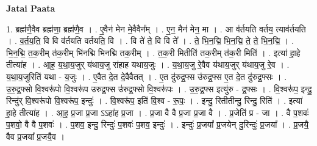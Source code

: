 \documentclass[17pt]{extarticle}
\begin{document}
\textbf{Jatai Paata} \newline

1. ब्रह्म॑णै॒वैव ब्रह्म॑णा॒ ब्रह्म॑णै॒व । . ए॒वैन॑ मेन मे॒वैवैन᳚म् । . ए॒न॒ मैन॑ मेन॒ मा । . आ व॑र्तयति वर्तय॒ त्याव॑र्तयति । . व॒र्त॒य॒ति॒ वि वि व॑र्तयति वर्तयति॒ वि । . वि ते॑ ते॒ वि वि ते᳚ । . ते॒ भि॒न॒द्मि॒ भि॒न॒द्मि॒ ते॒ ते॒ भि॒न॒द्मि॒ । . भि॒न॒द्मि॒ त॒क॒रीम् त॑क॒रीम् भि॑नद्मि भिनद्मि तक॒रीम् । . त॒क॒री मितीति॑ तक॒रीम् त॑क॒री मिति॑ । . इत्या॑ हा॒हे तीत्या॑ह । . आ॒ह॒ य॒था॒य॒जुर् य॑थाय॒जु रा॑हाह यथाय॒जुः । . य॒था॒य॒जु रे॒वैव य॑थाय॒जुर् य॑थाय॒जु रे॒व । . य॒था॒य॒जुरिति॑ यथा - य॒जुः । . ए॒वैत दे॒त दे॒वैवैतत् । . ए॒त दु॑रुद्र॒फ्स उ॑रुद्र॒फ्स ए॒त दे॒त दु॑रुद्र॒फ्सः । . उ॒रु॒द्र॒फ्सो वि॒श्वरू॑पो वि॒श्वरू॑प उरुद्र॒फ्स उ॑रुद्र॒फ्सो वि॒श्वरू॑पः । . उ॒रु॒द्र॒फ्स इत्यु॑रु - द्र॒फ्सः । . वि॒श्वरू॑प॒ इन्दु॒ रिन्दु॑र् वि॒श्वरू॑पो वि॒श्वरू॑प॒ इन्दुः॑ । . वि॒श्वरू॑प॒ इति॑ वि॒श्व - रू॒पः॒ । . इन्दु॒ रितीतीन्दु॒ रिन्दु॒ रिति॑ । . इत्या॑ हा॒हे तीत्या॑ह । . आ॒ह॒ प्र॒जा प्र॒जा ऽऽहा॑ह प्र॒जा । . प्र॒जा वै वै प्र॒जा प्र॒जा वै । . प्र॒जेति॑ प्र - जा । . वै प॒शवः॑ प॒शवो॒ वै वै प॒शवः॑ । . प॒शव॒ इन्दु॒ रिन्दुः॑ प॒शवः॑ प॒शव॒ इन्दुः॑ । . इन्दुः॑ प्र॒जया᳚ प्र॒जयेन् दु॒रिन्दुः॑ प्र॒जया᳚ । . प्र॒जयै॒ वैव प्र॒जया᳚ प्र॒जयै॒व । \newline
\end{document}

